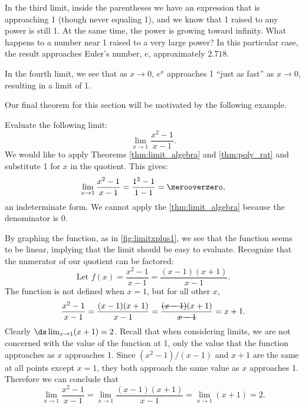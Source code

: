 In the third limit, inside the parentheses we have an expression that is approaching 1 (though never equaling 1), and we know that 1 raised to any power is still 1. At the same time, the power is growing toward infinity. What happens to a number near 1 raised to a very large power? In this particular case, the result approaches Euler's number, $e$, approximately $2.718.$

In the fourth limit, we see that as $x\to 0$, $e^x$ approaches 1 ``just as fast'' as $x\to 0$, resulting in a limit of 1.

Our final theorem for this section will be motivated by the following example.

\begin{example}\label{ex_limit_onept}
Evaluate the following limit:\vspace{-.3\baselineskip}
\[\lim_{x\to 1}\frac{x^2-1}{x-1}.\]
\solution
We would like to apply Theorems \ref{thm:limit_algebra} and \ref{thm:poly_rat} and substitute 1 for $x$ in the quotient. This gives:
\[\lim_{x\to 1}\frac{x^2-1}{x-1} = \frac{1^2-1}{1-1} = \zerooverzero,\]
an indeterminate form. We cannot apply the \autoref{thm:limit_algebra} because the denominator is 0.


By graphing the function, as in \autoref{fig:limitxplus1}, we see that the function seems to be linear, implying that the limit should be easy to evaluate. Recognize that the numerator of our quotient can be factored:
\[\text{Let \ } f(x)=\frac{x^2-1}{x-1} = \frac{(x-1)(x+1)}{x-1}.\]
The function is not defined when $x=1$, but for all other $x$,
\[\frac{x^2-1}{x-1} = \frac{(x-1)(x+1)}{x-1} = \frac{\hbox{\sout{$(x-1)$}}(x+1)}{\hbox{\sout{$x-1$}}}= x+1.\]
Clearly $\ds\lim_{x\to 1}(x+1)=2$. Recall that when considering limits, we are not concerned with the value of the function at 1, only the value that the function approaches as $x$ approaches 1. Since $(x^2-1)/(x-1)$ and $x+1$ are the same at all points except $x=1$, they both approach the same value as $x$ approaches 1. Therefore we can conclude that
\[\lim_{x\to 1}\frac{x^2-1}{x-1}=\lim_{x\to 1}\frac{(x-1)(x+1)}{x-1}=\lim_{x\to 1} (x+1)=2.\]
\end{example}

